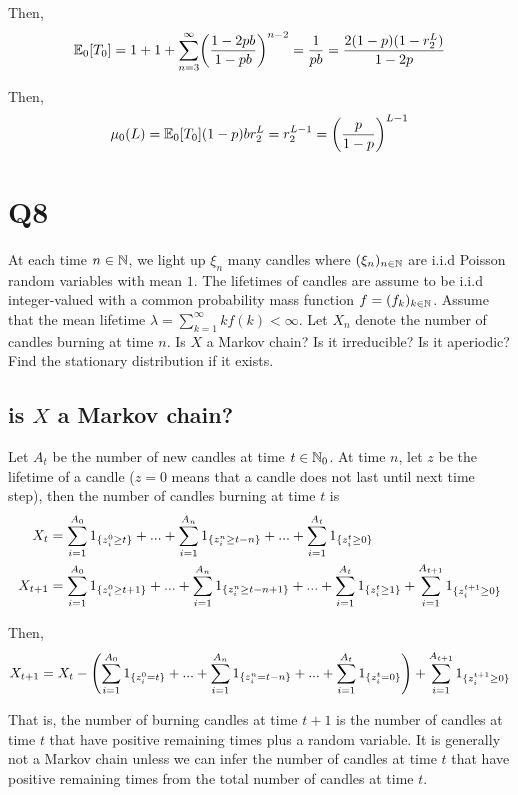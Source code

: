 \documentclass{article}
\begin{document}
Then,
$$
    \Exp_0[T_0] = 1 + 1 + \sum_{n=3}^\infty \tuple*{\frac{1 - 2pb}{1-pb}}^{n-2} = \frac{1}{pb} = \frac{2(1-p)(1-r_2^L)}{1 - 2p}
$$

Then, 
$$
    \mu_0(L) = \Exp_0[T_0] (1 - p) b r_2^L = r_2^{L-1} = \tuple*{\frac{p}{1-p}}^{L-1}
$$

\section{Q8}

At each time $n \in \N$, we light up $\xi_n$ many candles where $(\xi_n)_{n \in \N}$ are i.i.d Poisson random variables with mean $1$. The lifetimes of candles are assume to be i.i.d integer-valued with a common probability mass function $f = (f_k)_{k \in \N}$. Assume that the mean lifetime $\lambda = \sum_{k=1}^\infty k f(k) < \infty$. Let $X_n$ denote the number of candles burning at time $n$. Is $X$ a Markov chain? Is it irreducible? Is it aperiodic? Find the stationary distribution if it exists.

\subsection{is $X$ a Markov chain?}

Let $A_t$ be the number of new candles at time $t \in \N_0$. At time $n$, let $z$ be the lifetime of a candle ($z=0$ means that a candle does not last until next time step), then the number of candles burning at time $t$ is
\begin{align*}
    X_t &= \sum_{i=1}^{A_0} 1_{\set{z_i^0 \geq t}} + ... + \sum_{i=1}^{A_n} 1_{\set{z_i^n \geq t-n}} + ... + \sum_{i=1}^{A_t} 1_{\set{z_i^t \geq 0}} \\
    X_{t+1} &= \sum_{i=1}^{A_0} 1_{\set{z_i^0 \geq t+1}} + ... + \sum_{i=1}^{A_n} 1_{\set{z_i^n \geq t-n+1}} + ... + \sum_{i=1}^{A_t} 1_{\set{z_i^t \geq 1}} + \sum_{i=1}^{A_{t+1}} 1_{\set{z_i^{t+1} \geq 0}}
\end{align*}

Then, 
$$
    X_{t+1} = X_{t} - \tuple*{\sum_{i=1}^{A_0} 1_{\set{z_i^0 = t}} + ... + \sum_{i=1}^{A_n} 1_{\set{z_i^n= t-n}} + ... + \sum_{i=1}^{A_t} 1_{\set{z_i^t = 0}}} + \sum_{i=1}^{A_{t+1}} 1_{\set{z_i^{t+1} \geq 0}}
$$

That is, the number of burning candles at time $t+1$ is the number of candles at time $t$ that have positive remaining times plus a random variable. It is generally not a Markov chain unless we can infer the number of candles at time $t$ that have positive remaining times from the total number of candles at time $t$.
\end{document}
